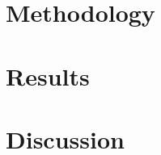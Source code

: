 \documentclass[]{report}
\begin{document}
	\section{Methodology}
	\lipsum
	\section{Results}
	\newpage	
	\section{Discussion}
\end{document}
